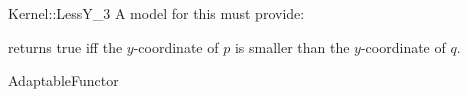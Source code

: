 \begin{ccRefFunctionObjectConcept}{Kernel::LessY_3}
A model for this must provide:


{returns true iff the $y$-coordinate of $p$ is smaller than the
$y$-coordinate of $q$.}

\ccRefines
AdaptableFunctor

\ccSeeAlso
{}\\

\end{ccRefFunctionObjectConcept}
